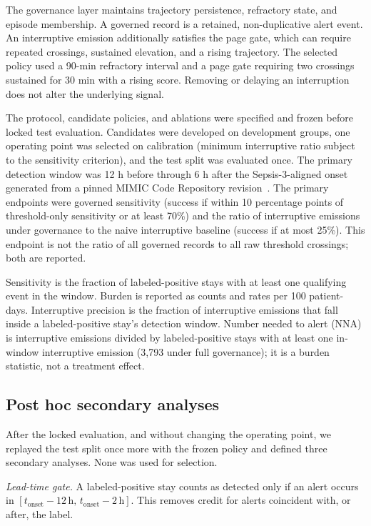 \documentclass[journal]{IEEEtran}
\begin{document}
The governance layer maintains trajectory persistence, refractory state, and
episode membership. A governed record is a retained, non-duplicative alert
event. An interruptive emission additionally satisfies the page gate, which
can require repeated crossings, sustained elevation, and a rising
trajectory. The selected policy used a 90-min refractory interval and a page
gate requiring two crossings sustained for 30 min with a rising score.
Removing or delaying an interruption does not alter the underlying signal.

The protocol, candidate policies, and ablations were specified and frozen
before locked test evaluation. Candidates were developed on development
groups, one operating point was selected on calibration (minimum interruptive
ratio subject to the sensitivity criterion), and the test split was evaluated
once. The primary detection window was 12 h before through 6 h after the
Sepsis-3-aligned onset generated from a pinned MIMIC Code Repository
revision~\cite{johnson2018code,seymour2016}. The primary endpoints were
governed sensitivity (success if within 10 percentage points of threshold-only
sensitivity or at least 70\%) and the ratio of interruptive emissions under
governance to the naive interruptive baseline (success if at most 25\%). This
endpoint is not the ratio of all governed records to all raw threshold
crossings; both are reported.

Sensitivity is the fraction of labeled-positive stays with at least one
qualifying event in the window. Burden is reported as counts and rates per 100
patient-days. Interruptive precision is the fraction of interruptive
emissions that fall inside a labeled-positive stay's detection window. Number
needed to alert (NNA) is interruptive emissions divided by labeled-positive
stays with at least one in-window interruptive emission (3,793 under full
governance); it is a burden statistic, not a treatment effect.

\subsection{Post hoc secondary analyses}

After the locked evaluation, and without changing the operating point, we
replayed the test split once more with the frozen policy and defined three
secondary analyses. None was used for selection.

\emph{Lead-time gate.} A labeled-positive stay counts as detected only if an
alert occurs in $[t_{\mathrm{onset}}-12\,\mathrm{h},\,
t_{\mathrm{onset}}-2\,\mathrm{h}]$. This removes credit for alerts coincident
with, or after, the label.
\end{document}
